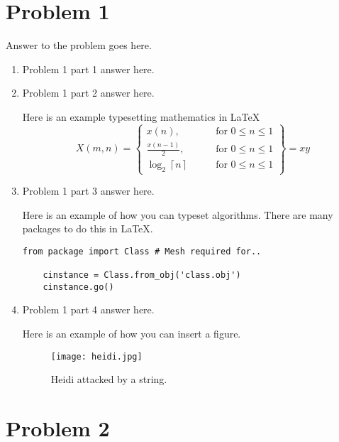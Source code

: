 \documentclass[12pt,letterpaper]{article}
\begin{document}
\section*{Problem 1}

Answer to the problem goes here.

\begin{enumerate}
    \item
          Problem 1 part 1 answer here.
    \item
          Problem 1 part 2 answer here.

          Here is an example typesetting mathematics in \LaTeX
          \begin{equation*}
              X(m,n) = \left\{\begin{array}{lr}
                  x(n),                                    & \text{for } 0\leq n\leq 1 \\
                  \frac{x(n-1)}{2},                        & \text{for } 0\leq n\leq 1 \\
                  \log_2 \left\lceil n \right\rceil \qquad & \text{for } 0\leq n\leq 1
              \end{array}\right\} = xy
          \end{equation*}

    \item Problem 1 part 3 answer here.

          Here is an example of how you can typeset algorithms.
          There are many packages to do this in \LaTeX.

          \begin{lstlisting}[style = Python]
    from package import Class # Mesh required for..
    
    cinstance = Class.from_obj('class.obj')
    cinstance.go()
    \end{lstlisting}

    \item Problem 1 part 4 answer here.

          Here is an example of how you can insert a figure.
          \begin{figure}[!h]
              \centering
              \texttt{[image: heidi.jpg]}
              \caption{Heidi attacked by a string.}
          \end{figure}
\end{enumerate}


\section*{Problem 2}
\end{document}
